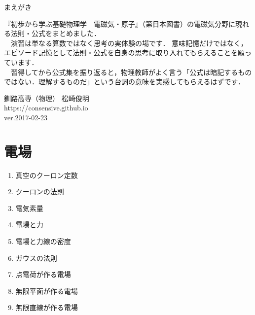 \documentclass[10pt]{jarticle}
\begin{document}
\addtocounter{page}{-1}
\thispagestyle{empty}

まえがき\\

{\scriptsize
『初歩から学ぶ基礎物理学　電磁気・原子』（第日本図書）の電磁気分野に現れる法則・公式をまとめました．\\

　演習は単なる算数ではなく思考の実体験の場です．
意味記憶だけではなく，エピソード記憶として法則・公式を自身の思考に取り入れてもらえることを願っています．\\

　習得してから公式集を振り返ると，物理教師がよく言う「公式は暗記するものではない．理解するものだ」という台詞の意味を実感してもらえるはずです．




\vfill
\hfill 釧路高専（物理） 松崎俊明\\
\hfill https://consensive.github.io\\

\vskip-3mm \hfill ver.2017-02-23\\
}



\addtocounter{page}{-1}
\thispagestyle{empty}
\tableofcontents



\newpage
\addtocounter{page}{-1}
\thispagestyle{empty}
\section{電場}

\begin{enumerate}
\small
\itemsep-4mm
\item 真空のクーロン定数 \\
\item クーロンの法則 \\
\item 電気素量 \\
\item 電場と力 \\
\item 電場と力線の密度 \\
\item ガウスの法則 \\
\item 点電荷が作る電場 \\
\item 無限平面が作る電場 \\
\item 無限直線が作る電場 \\
\end{enumerate}
\end{document}

